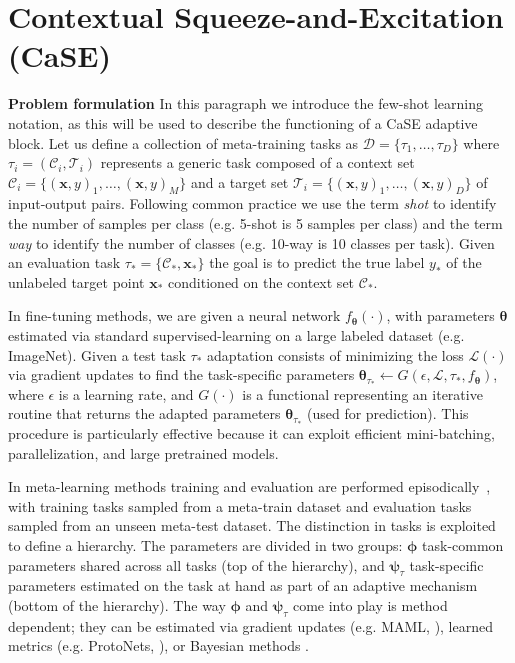 \documentclass{article}
\begin{document}
\section{Contextual Squeeze-and-Excitation (CaSE)} \label{sec:contextual_squeeze_and_excitation}

\textbf{Problem formulation} In this paragraph we introduce the few-shot learning notation, as this will be used to describe the functioning of a CaSE adaptive block. Let us define a collection of meta-training tasks as $\mathcal{D} = \{ \tau_1, \dots, \tau_D\}$ where $\tau_i = (\mathcal{C}_i, \mathcal{T}_i )$ represents a generic task composed of a context set $\mathcal{C}_i = \{(\mathbf{x}, y)_1, \dots, (\mathbf{x}, y)_M \}$ and a target set $\mathcal{T}_i = \{(\mathbf{x}, y)_1, \dots, (\mathbf{x}, y)_D \}$ of input-output pairs. Following common practice we use the term \emph{shot} to identify the number of samples per class (e.g. 5-shot is 5 samples per class) and the term \emph{way} to identify the number of classes (e.g. 10-way is 10 classes per task). 
Given an evaluation task $\tau_{\ast} = \{\mathcal{C}_{\ast}, \mathbf{x}_{\ast} \}$ the goal is to predict the true label $y_{\ast}$ of the unlabeled target point $\mathbf{x}_{\ast}$ conditioned on the context set $\mathcal{C}_{\ast}$.

In fine-tuning methods, we are given a neural network $f_{\boldsymbol{\theta}}(\cdot)$, with parameters $\boldsymbol{\theta}$ estimated via standard supervised-learning on a large labeled dataset (e.g. ImageNet). Given a test task $\tau_{\ast}$ adaptation consists of minimizing the loss $\mathcal{L}(\cdot)$ via gradient updates to find the task-specific parameters
$\boldsymbol{\theta}_{\tau_{\ast}} \leftarrow G(\epsilon, \mathcal{L}, \tau_{\ast}, f_{\boldsymbol{\theta}})$, where $\epsilon$ is a learning rate, and $G(\cdot)$ is a functional representing an iterative routine that returns the adapted parameters $\boldsymbol{\theta}_{\tau_{\ast}}$ (used for prediction). This procedure is particularly effective because it can exploit efficient mini-batching, parallelization, and large pretrained models.

In meta-learning methods training and evaluation are performed episodically~\citep{vinyals2016matching}, with training tasks sampled from a meta-train dataset and evaluation tasks sampled from an unseen meta-test dataset. The distinction in tasks is exploited to define a hierarchy.
The parameters are divided in two groups: $\boldsymbol{\phi}$ task-common parameters shared across all tasks (top of the hierarchy), and $\boldsymbol{\psi}_\tau$ task-specific parameters estimated on the task at hand as part of an adaptive mechanism (bottom of the hierarchy). The way $\boldsymbol{\phi}$ and  $\boldsymbol{\psi}_\tau$ come into play is method dependent; they can be estimated via gradient updates (e.g. MAML, \citealt{finn2017model}), learned metrics (e.g. ProtoNets, \citealt{snell2017prototypical}), or Bayesian methods \citep{gordon2018meta, patacchiola2020bayesian, sendera2021non}.
\end{document}
